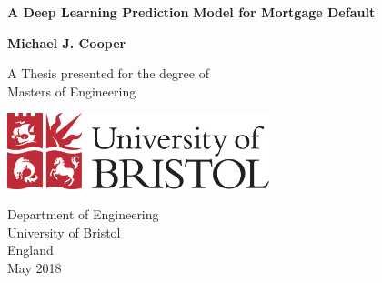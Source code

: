 
\setcounter{page}{1}

\newpage

\thispagestyle{empty}
\begin{center}
  \vspace*{1cm}
  {\Huge \bf A Deep Learning Prediction}
    \vspace*{0.3cm}
  {\Huge \bf Model for Mortgage Default}

  \vspace*{3cm}
  {\LARGE\bf Michael J. Cooper}

  \vfill

  {\Large A Thesis presented for the degree of\\
         [1mm] Masters of Engineering}
  \vspace*{0.9cm}
  
   \begin{center}
   \includegraphics[width=3in]{uob_logo.jpg}
   \end{center}

  {\large
          Department of Engineering\\
          [-3mm] University of Bristol\\
          [-3mm] England\\
          [1mm]  May 2018
  }

\end{center}

